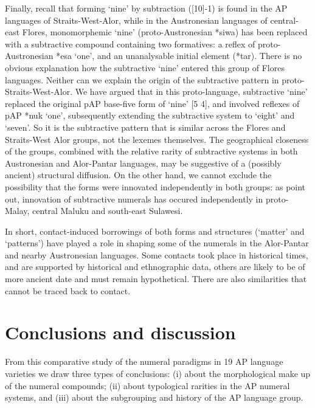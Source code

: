 Finally, recall that forming `nine' by subtraction ([10]-1) is found in the AP languages of Straits-West-Alor, while in the Austronesian languages of central-east Flores, monomorphemic `nine' (proto-Austronesian *siwa) has been replaced with a subtractive compound containing two formatives: a reflex of proto-Austronesian *esa `one', and an unanalysable initial element (*tar). There is no obvious explanation how the subtractive `nine' entered this group of Flores languages. Neither can we explain the origin of the subtractive pattern in proto-Straits-West-Alor. We have argued that in this proto-language, subtractive `nine' replaced the original pAP base-five form of `nine' [5 4], and involved reflexes of pAP *nuk `one', subsequently extending the subtractive system to `eight' and `seven'. So it is the subtractive pattern that is similar across the Flores and Straits-West Alor groups, not the lexemes themselves. The geographical closeness of the groups, combined with the relative rarity of subtractive systems in both Austronesian and Alor-Pantar languages, may be suggestive of a (possibly ancient) structural diffusion. On the other hand, we cannot exclude the possibility that the forms were innovated independently in both groups: as \citet{SchapperEtAl2013} point out, innovation of subtractive numerals has occured independently in proto-Malay, central Maluku and south-east Sulawesi. 

In short, contact-induced borrowings of both forms and structures (`matter' and `patterns') have played a role in shaping some of the numerals in the Alor-Pantar and nearby Austronesian languages. Some contacts took place in historical times, and are supported by historical and ethnographic data, others are likely to be of more ancient date and must remain hypothetical. There are also similarities that cannot be traced back to contact. 

\section{Conclusions and discussion}\label{sec:6:8}
From this comparative study of the numeral paradigms in 19 AP language varieties we draw three types of conclusions: (i) about the morphological make up of the numeral compounds; (ii) about typological rarities in the AP numeral systems, and (iii) about the subgrouping and history of the AP language group.

